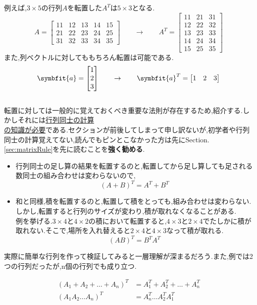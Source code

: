 例えば,$3\times5$の行列$A$を転置した$A^T$は$5\times3$となる.
\[
A=\begin{bmatrix}
    11 & 12 & 13 & 14 & 15 \\
    21 & 22 & 23 & 24 & 25 \\ 
    31 & 32 & 33 & 34 & 35 
\end{bmatrix}\qquad\to\qquad
A^T=
\begin{bmatrix}
    11 & 21 & 31 \\
    12 & 22 & 32 \\
    13 & 23 & 33 \\
    14 & 24 & 34 \\
    15 & 25 & 35 
\end{bmatrix}
\]
また,列ベクトルに対してももちろん転置は可能である.
\[
    \symbfit{a}=\begin{bmatrix}
        1 \\ 2 \\ 3
    \end{bmatrix}\qquad\to\qquad
    \symbfit{a}^T=\begin{bmatrix}
        1 & 2 & 3
    \end{bmatrix}
\]
\bigskip\\
転置に対しては一般的に覚えておくべき重要な法則が存在するため,紹介する.しかしそれには\underline{行列同士の計算}\\\underline{の知識が必要}である.セクションが前後してしまって申し訳ないが,初学者や行列同士の計算覚えてない,読んでもピンとこなかった方は先にSection.\ref{sec:matrixRule}を先に読むことを\textbf{強く勧める}.
\begin{itemize}
    \item 行列同士の足し算の結果を転置するのと,転置してから足し算しても足される数同士の組み合わせは変わらないので,
\[
    (A+B)^T=A^T+B^T
\]
\item 和と同様,積を転置するのと,転置して積をとっても,組み合わせは変わらない.しかし,転置すると行列のサイズが変わり,積が取れなくなることがある.\\
例を挙げる.$3\times4$と$4\times2$の積において転置すると,$4\times3$と$2\times4$でたしかに積が取れない.そこで,場所を入れ替えると$2\times4$と$4\times3$なって積が取れる.
\[
    (AB)^T = B^TA^T
\]
\end{itemize}
実際に簡単な行列を作って検証してみると一層理解が深まるだろう.また,例では2つの行列だったが,n個の行列でも成り立つ.
\begin{tcolorbox}[colframe=black!80,colback=white,title=転置の性質]
\begin{align*}
    (A_1+A_2+\dots+A_n)^T&=A_1^T+A_2^T+\dots+A_n^T\\
        (A_1A_2\dots A_n)^T&=A_n^T\dots A_2^TA_1^T
\end{align*}
\end{tcolorbox}
